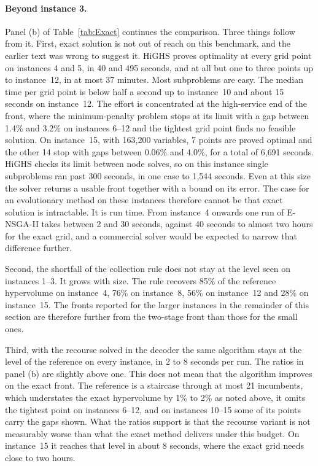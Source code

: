 \documentclass[11pt, a4paper]{article}
\begin{document}
\paragraph{Beyond instance 3.} Panel (b) of Table~\ref{tab:Exact} continues the comparison. Three things follow from it. First, exact solution is not out of reach on this benchmark, and the earlier text was wrong to suggest it. HiGHS proves optimality at every grid point on instances 4 and 5, in 40 and 495 seconds, and at all but one to three points up to instance~12, in at most 37 minutes. Most subproblems are easy. The median time per grid point is below half a second up to instance~10 and about 15 seconds on instance~12. The effort is concentrated at the high-service end of the front, where the minimum-penalty problem stops at its limit with a gap between 1.4\% and 3.2\% on instances 6--12 and the tightest grid point finds no feasible solution. On instance~15, with 163{,}200 variables, 7 points are proved optimal and the other 14 stop with gaps between 0.06\% and 4.0\%, for a total of 6{,}691 seconds. HiGHS checks its limit between node solves, so on this instance single subproblems ran past 300 seconds, in one case to 1{,}544 seconds. Even at this size the solver returns a usable front together with a bound on its error. The case for an evolutionary method on these instances therefore cannot be that exact solution is intractable. It is run time. From instance~4 onwards one run of E-NSGA-II takes between 2 and 30 seconds, against 40 seconds to almost two hours for the exact grid, and a commercial solver would be expected to narrow that difference further.

Second, the shortfall of the collection rule does not stay at the level seen on instances 1--3. It grows with size. The rule recovers 85\% of the reference hypervolume on instance~4, 76\% on instance~8, 56\% on instance~12 and 28\% on instance~15. The fronts reported for the larger instances in the remainder of this section are therefore further from the two-stage front than those for the small ones.

Third, with the recourse solved in the decoder the same algorithm stays at the level of the reference on every instance, in 2 to 8 seconds per run. The ratios in panel (b) are slightly above one. This does not mean that the algorithm improves on the exact front. The reference is a staircase through at most 21 incumbents, which understates the exact hypervolume by 1\% to 2\% as noted above, it omits the tightest point on instances 6--12, and on instances 10--15 some of its points carry the gaps shown. What the ratios support is that the recourse variant is not measurably worse than what the exact method delivers under this budget. On instance~15 it reaches that level in about 8 seconds, where the exact grid needs close to two hours.
\end{document}
